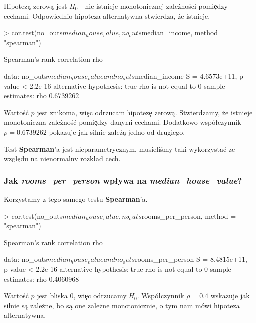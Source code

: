 \documentclass{article}
\begin{document}
\noindent
\quad Hipotezą zerową jest \textbf{$H_0$} - nie istnieje monotonicznej zależności pomi\c edzy cechami. Odpowiednio hipoteza alternatywna stwierdza, że istnieje.

\begin{Schunk}
\begin{Sinput}
> cor.test(no_outs$median_house_value, no_outs$median_income, method = "spearman")
\end{Sinput}
\begin{Soutput}
	Spearman's rank correlation rho

data:  no_outs$median_house_value and no_outs$median_income
S = 4.6573e+11, p-value < 2.2e-16
alternative hypothesis: true rho is not equal to 0
sample estimates:
      rho 
0.6739262 
\end{Soutput}
\end{Schunk}

\noindent
\quad Wartoś\'c $p$ jest znikoma, wi\c ec odrzucam hipotez\c e zerową. Stwierdzamy, że istnieje monotoniczna zależnoś\'c pomi\c edzy danymi cechami. Dodatkowo wspó\l czynnik $\rho = 0.6739262$ pokazuje jak silnie zależą jedno od drugiego.

\noindent
\quad Test \textbf{Spearman}'a jest nieparametrycznym, musieliśmy taki wykorzysta\'c ze wzgl\c edu na nienormalny rozk\l ad cech.

\subsubsection{Jak \textit{rooms\_per\_person} wp\l ywa na \textit{median\_house\_value}?}
\quad Korzystamy z tego samego testu \textbf{Spearman}'a.

\begin{Schunk}
\begin{Sinput}
> cor.test(no_outs$median_house_value, no_outs$rooms_per_person, method = "spearman")
\end{Sinput}
\begin{Soutput}
	Spearman's rank correlation rho

data:  no_outs$median_house_value and no_outs$rooms_per_person
S = 8.4815e+11, p-value < 2.2e-16
alternative hypothesis: true rho is not equal to 0
sample estimates:
      rho 
0.4060968 
\end{Soutput}
\end{Schunk}

\noindent
\quad Wartoś\'c $p$ jest bliska 0, wi\c ec odrzucamy \textbf{$H_0$}. Wspó\l czynnik $\rho = 0.4$ wskazuje jak silnie są zależne, bo są one zależne monotonicznie, o tym nam mówi hipoteza alternatywna.
\end{document}
